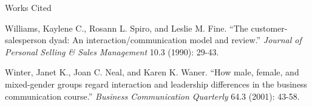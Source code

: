 \documentclass[12pt]{article}
\newcommand{\bibent}{\noindent \hangindent 40pt}
\newenvironment{workscited}{\newpage \begin{center} Works Cited \end{center}}{\newpage }
\begin{document}
\begin{flushleft}



\newpage
\begin{workscited}

  
\bibent
Williams, Kaylene C., Rosann L. Spiro, and Leslie M. Fine. ``The customer-salesperson dyad: An interaction/communication model and review.'' \textit{Journal of Personal Selling \& Sales Management} 10.3 (1990): 29-43.

\bibent
Winter, Janet K., Joan C. Neal, and Karen K. Waner. ``How male, female, and mixed-gender groups regard interaction and leadership differences in the business communication course.''  \textit{Business Communication Quarterly} 64.3 (2001): 43-58.



\end{workscited}

\end{flushleft}
\end{document}
